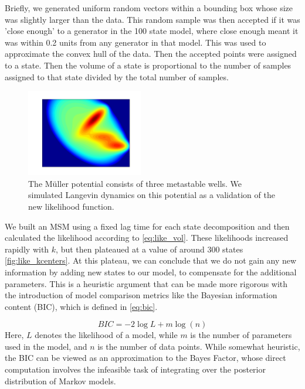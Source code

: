 \documentclass[twocolumn,floatfix,nofootinbib,aps]{revtex4-1}
\begin{document}
Briefly, we generated uniform random vectors within a bounding box whose size was slightly larger than the data. This random sample was then accepted if it was 'close enough' to a generator in the 100 state model, where close enough meant it was within 0.2 units from any generator in that model. This was used to approximate the convex hull of the data. Then the accepted points were assigned to a state. Then the volume of a state is proportional to the number of samples assigned to that state divided by the total number of samples. %
\begin{figure}[h!]
\includegraphics[width=2in]{figs/muller_pot.png}
\caption{The M\"{u}ller potential consists of three metastable wells. We simulated Langevin dynamics on this potential as a validation of the new likelihood function.}
\label{fig:muller_pot}
\end{figure} 

We built an MSM using a fixed lag time for each state decomposition and then calculated the likelihood according to \cref{eq:like_vol}. These likelihoods increased rapidly with $k$, but then plateaued at a value of around 300 states \cref{fig:like_kcenters}. At this plateau, we can conclude that we do not gain any new information by adding new states to our model, to compensate for the additional parameters. This is a heuristic argument that can be made more rigorous with the introduction of model comparison metrics like the Bayesian information content (BIC), which is defined in \cref{eq:bic}.

\begin{equation}
BIC = -2 \log L + m \log(n) 
\label{eq:bic}
\end{equation} Here, $L$ denotes the likelihood of a model, while $m$ is the number of parameters used in the model, and $n$ is the number of data points. While somewhat heuristic, the BIC can be viewed as an approximation to the Bayes Factor, whose direct computation involves the infeasible task of integrating over the posterior distribution of Markov models.
\end{document}
